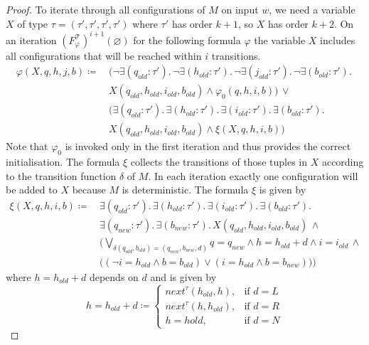 \begin{proof}
    To iterate through all configurations of $M$ on input $w$, we need a variable $X$ of type $\tau =
    (\tau', \tau', \tau', \tau')$ where $\tau'$ has order $k + 1$, so $X$ has order $k + 2$. On an iteration
    $(F_\varphi^\mathcal{T})^{i+1}(\varnothing)$ for the following formula $\varphi$ the variable $X$ includes
    all configurations that will be reached within $i$ transitions.
    \begin{align*}
        \varphi(X, q, h, j, b) \coloneqq &\,(\neg \exists (q_{old} \colon \tau').\, \neg\exists
        (h_{old}
        \colon \tau').\, \neg\exists (j_{old} \colon \tau').\, \neg\exists (b_{old} \colon \tau').\,\\
        &\, X(q_{old}, h_{old}, i_{old}, b_{old}) \wedge \varphi_0(q, h, i, b)) \,\vee \\
        &\,(\exists (q_{old} \colon \tau').\, \exists (h_{old} \colon \tau').\, \exists (i_{old} \colon
        \tau').\, \exists (b_{old} \colon \tau').\,\\
        &\, X(q_{old}, h_{old}, i_{old}, b_{old}) \wedge \xi(X, q, h, i, b))
    \end{align*}
    Note that $\varphi_0$ is invoked only in the first iteration and thus provides the correct initialisation. The
    formula $\xi$ collects the transitions of those tuples in $X$ according to the transition function $\delta$ of
    $M$. In each iteration exactly one configuration will be added to $X$ because $M$ is deterministic.
    The formula $\xi$ is given by
    \begin{align*}
        \xi(X, q, h, i, b) \coloneqq &\,\exists (q_{old} \colon \tau').\, \exists (h_{old} \colon
        \tau').\, \exists (i_{old} \colon \tau').\, \exists (b_{old} \colon \tau').\, \\
        &\,\exists (q_{new} \colon \tau').\, \exists (b_{new} \colon \tau').\,X(q_{old}, h_{old}, i_{old},
        b_{old}) \,\wedge \\
        &\, \Big(\underset{\delta(q_{old}, b_{old}) = (q_{new}, b_{new}, d)}{\bigvee} q = q_{new} \wedge h =
        h_{old} + d \wedge i = i_{old}\,\wedge\\&\, \big((\neg i = h_{old} \wedge b =
        b_{old}) \vee (i = h_{old} \wedge b = b_{new})\big)\Big)
    \end{align*}
    where $h = h_{old} + d$ depends on $d$ and is given by
    \[h = h_{old} + d \coloneqq
    \begin{cases}
        next^\tau(h_{old}, h),  & \text{if } d = L\\
        next^\tau(h, h_{old}),  & \text{if } d = R\\
        h = h{old},  & \text{if } d = N
    \end{cases}\]


\end{proof}
